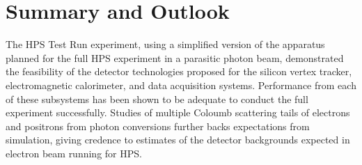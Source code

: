\documentclass[final,3p,times,twocolumn]{elsarticle}
\begin{document}


\section{Summary and Outlook}
The HPS Test Run experiment, using a simplified version of the apparatus planned for the full HPS 
experiment in a parasitic photon beam, demonstrated the feasibility of the detector technologies 
proposed for the silicon vertex tracker, electromagnetic calorimeter, and data acquisition systems. 
Performance from each of these subsystems has been shown to be adequate to conduct the full 
experiment successfully. Studies of multiple Coloumb scattering tails of electrons and positrons from 
photon conversions further backs expectations from simulation, giving credence to estimates of the 
detector backgrounds expected in electron beam running for HPS.  


\end{document}
